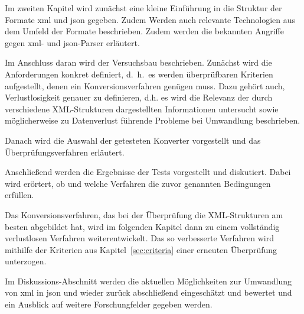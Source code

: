 Im zweiten Kapitel wird zunächst eine kleine Einführung in die Struktur der Formate \acrshort{xml} und \acrshort{json} gegeben. Zudem Werden auch relevante Technologien aus dem Umfeld der Formate beschrieben.  Zudem werden die bekannten Angriffe gegen \acrshort{xml}- und \acrshort{json}-Parser erläutert.

Im Anschluss daran wird der Versuchsbau beschrieben. Zunächst wird die Anforderungen konkret definiert, d.~h.\ es werden
überprüfbaren Kriterien aufgestellt, denen ein Konversionsverfahren genügen
muss. Dazu gehört auch, Verlustlosigkeit genauer zu definieren, d.h.
es wird die Relevanz der durch verschiedene XML-Strukturen dargestellten
Informationen untersucht sowie möglicherweise zu Datenverlust führende
Probleme bei Umwandlung beschrieben.

Danach wird die Auswahl der getesteten Konverter vorgestellt und das Überprüfungsverfahren erläutert.

Anschließend werden die Ergebnisse der Tests vorgestellt und diskutiert.
Dabei wird erörtert, ob und welche Verfahren die zuvor genannten Bedingungen
erfüllen.

Das Konversionsverfahren, das bei der Überprüfung die XML-Strukturen am besten abgebildet hat, wird im folgenden Kapitel dann zu einem vollständig verlustlosen Verfahren weiterentwickelt. Das so verbesserte Verfahren wird mithilfe der Kriterien aus Kapitel~\ref{sec:criteria} einer erneuten Überprüfung unterzogen.

Im Diskussions-Abschnitt werden die aktuellen Möglichkeiten zur Umwandlung
von \acrshort{xml} in \acrshort{json} und wieder zurück abschließend eingeschätzt und bewertet und ein Ausblick auf weitere Forschungfelder gegeben werden.
